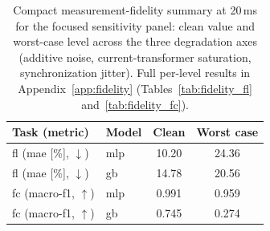 \begin{table}[pos=t]
\caption{Compact measurement-fidelity summary at 20\,ms for the focused sensitivity panel: clean value and worst-case level across the three degradation axes (additive noise, current-transformer saturation, synchronization jitter). Full per-level results in Appendix~\ref{app:fidelity} (Tables~\ref{tab:fidelity_fl} and~\ref{tab:fidelity_fc}).}
\label{tab:fidelity_summary}
\small
\centering
\begin{revblock}
\begin{tabular}{llcc}
\toprule
\textbf{Task (metric)} & \textbf{Model} & \textbf{Clean} & \textbf{Worst case} \\
\midrule
\ac{fl} (\ac{mae} [\%], $\downarrow$) & \ac{mlp} & 10.20 & 24.36 \\
\ac{fl} (\ac{mae} [\%], $\downarrow$) & \ac{gb}  & 14.78 & 20.56 \\
\midrule
\ac{fc} (macro-\ac{f1}, $\uparrow$) & \ac{mlp} & 0.991 & 0.959 \\
\ac{fc} (macro-\ac{f1}, $\uparrow$) & \ac{gb}  & 0.745 & 0.274 \\
\bottomrule
\end{tabular}
\end{revblock}
\end{table}
